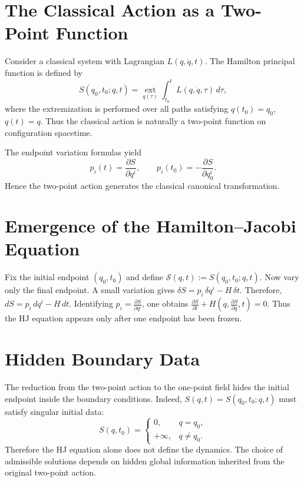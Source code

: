 \section{The Classical Action as a Two-Point Function}

Consider a classical system with Lagrangian
$L(q,\dot q,t)$.
The Hamilton principal function is defined by
\begin{equation}
S(q_0,t_0;q,t)=\operatorname*{ext}_{q(\tau)}
\int_{t_0}^{t} L(q,\dot q,\tau)\,d\tau,
\label{principal}
\end{equation}
where the extremization is performed over all paths satisfying
$q(t_0)=q_0$, $q(t)=q$.
Thus the classical action is naturally a two-point function on configuration spacetime.

The endpoint variation formulas yield
\begin{equation}
p_i(t)=\frac{\partial S}{\partial q^i},
\qquad
p_i(t_0)=-\frac{\partial S}{\partial q_0^i}.
\label{endpoint}
\end{equation}
Hence the two-point action generates the classical canonical transformation.

\section{Emergence of the Hamilton--Jacobi Equation}

Fix the initial endpoint $(q_0,t_0)$ and define
$\mathcal S(q,t):=S(q_0,t_0;q,t)$.
Now vary only the final endpoint. A small variation gives
$\delta S=p_i\,\delta q^i - H\,\delta t$.
Therefore,
$dS = p_i\,dq^i - H\,dt$.
Identifying $p_i=\frac{\partial S}{\partial q^i}$,
one obtains $\frac{\partial S}{\partial t}+
H\left(q,\frac{\partial S}{\partial q},t\right)=0$.
Thus the HJ equation appears only after one endpoint has been frozen.

\section{Hidden Boundary Data}

The reduction from the two-point action to the one-point field hides the
initial endpoint inside the boundary conditions.
Indeed, $S(q,t)=S(q_0,t_0;q,t)$
must satisfy singular initial data:
\begin{equation}
S(q,t_0)=
\begin{cases}
0, & q=q_0,\\
+\infty, & q\neq q_0.
\end{cases}
\end{equation}
Therefore the HJ equation alone does not define the dynamics. The choice of
admissible solutions depends on hidden global information inherited from the
original two-point action.


